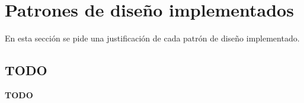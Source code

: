 \section{Patrones de diseño implementados}

En esta sección se pide una justificación de cada patrón de diseño implementado.

\subsection{TODO}

\textbf{TODO}
